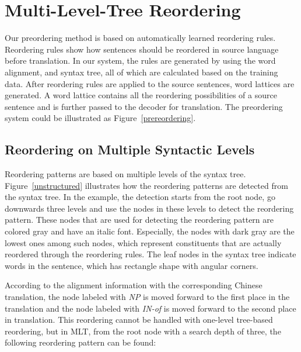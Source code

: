 \documentclass[a4paper]{article}
\begin{document}
\section{Multi-Level-Tree Reordering}
\label{mu}

Our preordering method is based on automatically learned reordering rules. Reordering rules show how sentences should be reordered in source language before translation. In our system, the rules are generated by using the word alignment, and syntax tree, all of which are calculated based on the training data. After reordering rules are applied to the source sentences, word lattices are generated. A word lattice contains all the reordering possibilities of a source sentence and is further passed to the decoder for translation. The preordering system could be illustrated as Figure~\ref{prereordering}.

\begin{figure*}
\centering
{}%

\caption{Illustration of preordering system}
\label{prereordering}
\end{figure*}

\subsection{Reordering on Multiple Syntactic Levels}

Reordering patterns are based on multiple levels of the syntax tree. Figure~\ref{unstructured} illustrates how the reordering patterns are detected from the syntax tree. In the example, the detection starts from the root node, go downwards three levels and use the nodes in these levels to detect the reordering pattern. These nodes that are used for detecting the reordering pattern are colored gray and have an italic font. Especially, the nodes with dark gray are the lowest ones among such nodes, which represent constituents that are actually reordered through the reordering rules. The leaf nodes in the syntax tree indicate words in the sentence, which has rectangle shape with angular corners.

According to the alignment information with the corresponding Chinese translation, the node labeled with \emph{NP} is moved forward to the first place in the translation and the node labeled with \emph{IN-of} is moved forward to the second place in translation. This reordering cannot be handled with one-level tree-based reordering, but in MLT, from the root node with a search depth of three, the following reordering pattern can be found:\bigskip
\end{document}
